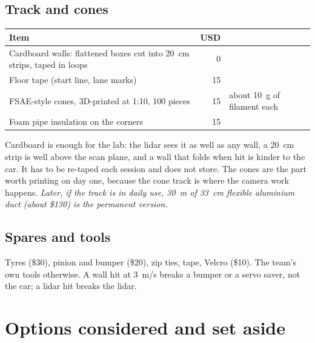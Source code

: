 \documentclass[11pt,a4paper]{article}
\begin{document}
\subsection{Track and cones}

\begin{tabularx}{\linewidth}{Xrl}
\toprule
Item & USD & \\
\midrule
Cardboard walls: flattened boxes cut into 20~cm strips, taped in loops & 0 & \\
Floor tape (start line, lane marks) & 15 & \\
FSAE-style cones, 3D-printed at 1:10, 100 pieces & 15 & about 10~g of filament each \\
Foam pipe insulation on the corners & 15 & \\
\bottomrule
\end{tabularx}

\smallskip
Cardboard is enough for the lab: the lidar sees it as well as any wall, a 20~cm strip is
well above the scan plane, and a wall that folds when hit is kinder to the car. It has to be
re-taped each session and does not store. The cones are the part worth printing on day one,
because the cone track is where the camera work happens. \emph{Later, if the track is in
daily use, 30~m of 33~cm flexible aluminium duct (about \$130) is the permanent version.}

\subsection{Spares and tools}

Tyres (\$30), pinion and bumper (\$20), zip ties, tape, Velcro (\$10). The team's own tools
otherwise. A wall hit at 3~m/s breaks a bumper or a servo saver, not the car; a lidar hit
breaks the lidar.

\section{Options considered and set aside}
\label{sec:setaside}
\end{document}
